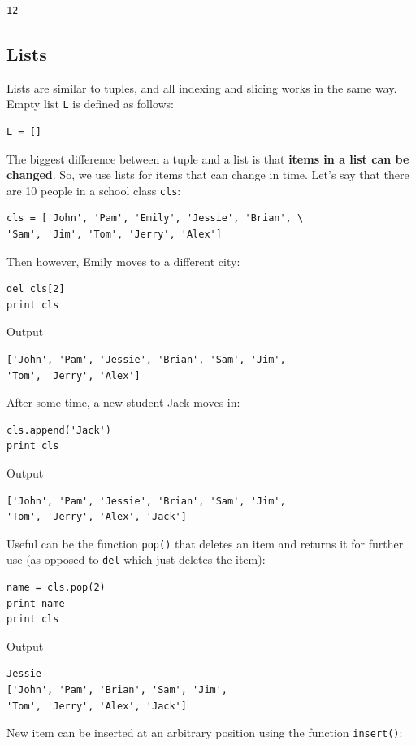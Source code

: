 \begin{verbatim}
12
\end{verbatim}

\subsection{Lists}

Lists are similar to tuples, and all indexing and slicing works in the same way. 
Empty list {\tt L} is defined as follows:

\begin{verbatim}
L = []
\end{verbatim}
The biggest difference between a tuple 
and a list is that {\bf items in a list can be changed}. So, we use
lists for items that can change in time. Let's say that there are 
10 people in a school class {\tt cls}:

\begin{verbatim}
cls = ['John', 'Pam', 'Emily', 'Jessie', 'Brian', \
'Sam', 'Jim', 'Tom', 'Jerry', 'Alex']
\end{verbatim}
Then however, Emily moves to a different city:

\begin{verbatim}
del cls[2]
print cls
\end{verbatim}
Output

\begin{verbatim}
['John', 'Pam', 'Jessie', 'Brian', 'Sam', 'Jim', 
'Tom', 'Jerry', 'Alex']
\end{verbatim}
After some time, a new student Jack moves in:

\begin{verbatim}
cls.append('Jack')
print cls
\end{verbatim}
Output

\begin{verbatim}
['John', 'Pam', 'Jessie', 'Brian', 'Sam', 'Jim', 
'Tom', 'Jerry', 'Alex', 'Jack']
\end{verbatim}
Useful can be the function {\tt pop()} that deletes an item and returns it for further
use (as opposed to {\tt del} which just deletes the item):

\begin{verbatim}
name = cls.pop(2)
print name 
print cls
\end{verbatim}
Output

\begin{verbatim}
Jessie
['John', 'Pam', 'Brian', 'Sam', 'Jim', 
'Tom', 'Jerry', 'Alex', 'Jack']
\end{verbatim}
New item can be inserted at an arbitrary position using the function {\tt insert()}:

